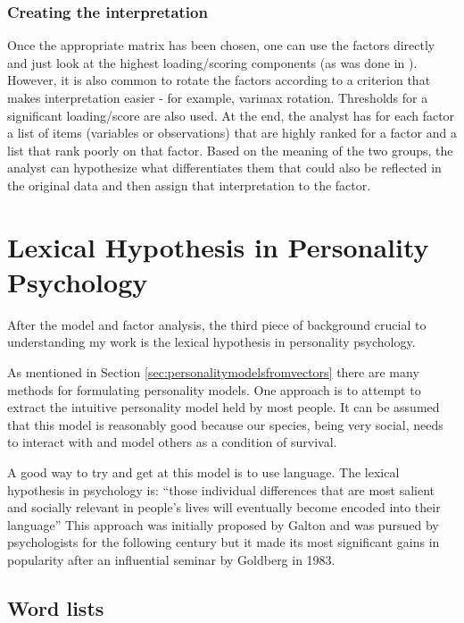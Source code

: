 \subsubsection{Creating the interpretation}

\label{sec:bg:factorinterpretation}
Once the appropriate matrix has been chosen, one can use the factors directly
and just look at the highest loading/scoring components (as was done in 
\citep{Samsonovich2010}). However, it is
also common to rotate the factors according to a criterion that makes 
interpretation easier - for example, varimax rotation. Thresholds for a 
significant loading/score are also used. At the end, the analyst has for each
factor a list of items (variables or observations) that are highly ranked for a 
factor and a list that rank poorly on that factor. Based on the meaning of the 
two groups, the analyst can hypothesize what differentiates them that could also
be reflected in the original data and then assign that interpretation to the 
factor.

\section{Lexical Hypothesis in Personality Psychology}

After the \modelname{} model and factor analysis, the third piece of background
crucial to understanding my work is the lexical hypothesis in personality 
psychology.

As mentioned in Section \ref{sec:personalitymodelsfromvectors} there are many
methods for formulating personality models. One approach is to attempt to extract the 
intuitive personality model held by most people. It can be assumed that this
model is reasonably good because our species, being very social, needs to 
interact with and model others as a condition of survival. 

A good way to try and get at this model is to use language. The lexical 
hypothesis in psychology is:
``those individual differences that are most salient and socially relevant in
people's lives will eventually become encoded into their language'' 
\citep[p. 204]{Goldberg1982} This approach was initially proposed by 
Galton \citep[p. 181]{Galton1884} and was pursued by psychologists for the following century
but it made its most significant gains in popularity after an influential seminar
by Goldberg in 1983. \citep[p. 90]{Deary2009}

\subsection{Word lists}

